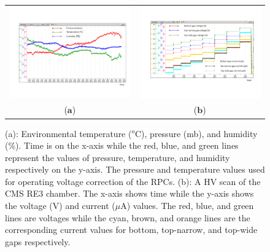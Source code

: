 \begin{figure}[h]
\centering
\begin{tabular}{cc}
\hspace{-0.3cm}
\includegraphics[scale=0.33,trim=50 70 20 90,clip]{fig/wincc/tprh.png}
& \hspace{-0.5cm} \includegraphics[scale=0.345,trim=50 100 45 80,clip]{fig/wincc/HV_Scan2.png}\\
   ($\mathbf{a}$)\qquad&($\mathbf{b}$)\qquad\\
\end{tabular}
\caption{(a): Environmental temperature ($^o$C), pressure (mb), and humidity (\%). Time is on the x-axis while the red, blue, and green lines represent the values of pressure, temperature, and humidity respectively on the y-axis. The pressure and temperature values used for operating voltage correction of the RPCs. (b): A HV scan of the CMS RE3 chamber. The x-axis shows time while the y-axis shows the voltage (V) and current ($\mu$A) values. The red, blue, and green lines are voltages while the cyan, brown, and orange lines are the corresponding current values for bottom, top-narrow, and top-wide gaps respectively.}\label{scan_temp}
\end{figure}

